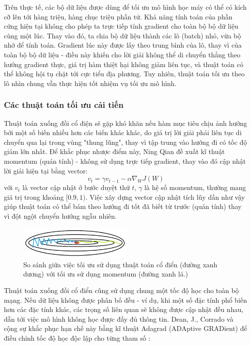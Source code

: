 \documentclass[12pt]{extreport}
\begin{document}
Trên thực tế, các bộ dữ liệu được dùng để tối ưu mô hình học máy có thể có kích cỡ lên tới hàng triệu, hàng chục triệu phần tử. Khả năng tính toán của phần cứng hiện tại không cho phép ta trực tiếp tính gradient cho toàn bộ bộ dữ liệu cùng một lúc. Thay vào đó, ta chia bộ dữ liệu thành các lô (batch) nhỏ, vừa bộ nhớ để tính toán. Gradient lúc này được lấy theo trung bình của lô, thay vì của toàn bộ bộ dữ liệu - điều này khiến cho lời giải không thể di chuyển thẳng theo hướng gradient thực, giá trị hàm thiệt hại không giảm liên tục, và thuật toán có thể không hội tụ chặt tới cực tiểu địa phương. Tuy nhiên, thuật toán tối ưu theo lô nhìn chung vẫn thực hiện tốt nhiệm vụ tối ưu mô hình.

\subsubsection{Các thuật toán tối ưu cải tiến}

Thuật toán xuống đồi cổ điện sẽ gặp khó khăn nếu hàm mục tiêu chịu ảnh hưởng bởi một số biến nhiều hơn các biến khác khác, do giá trị lời giải phải liên tục di chuyển qua lại trong vùng "thung lũng", thay vì tập trung vào hướng đi có tốc độ giảm lớn nhất. Để khắc phục nhược điểm này, Ning Qian đề xuất kĩ thuật momentum (quán tính) \cite{QIAN1999145} - không sử dụng trực tiếp gradient, thay vào đó cập nhật lời giải hiện tại bằng vector:
$$ v_t = \gamma v_{t-1} - \alpha \nabla_{W} J(W)  $$
với $ v_t $ là vector cập nhật ở bước duyệt thứ $ t $, $ \gamma $ là hệ số momentum, thường mang giá trị trong khoảng $ [0.9, 1) $. Việc xây dựng vector cập nhật tích lũy dần như vậy giúp thuật toán có thể bám theo hướng đi tốt đã biết từ trước (quán tính) thay vì đột ngột chuyển hướng ngẫu nhiên.

\begin{figure}[H]
    \centering
    \includegraphics[width=0.5\textwidth]{figure12.png}
    \caption{So sánh giữa việc tối ưu sử dụng thuật toán cổ điển (đường xanh dương) với tối ưu sử dụng momentum (đường xanh lá.)}
\end{figure}

Thuật toán xuống đồi cổ điển cũng sử dụng chung một tốc độ học cho toàn bộ mạng. Nếu dữ liệu không được phân bố đều - ví dụ, khi một số đặc tính phổ biến hơn các đặc tính khác, các trọng số liên quan sẽ không được cập nhật đều nhau, dẫn tới việc mô hình không học được đầy đủ thông tin. Dean, J., Corrado và cộng sự khắc phục hạn chế này bằng kĩ thuật Adagrad (ADAptive GRADient) để điều chỉnh tốc độ học độc lập cho từng tham số \cite{duchi2011adaptive}:
\end{document}
